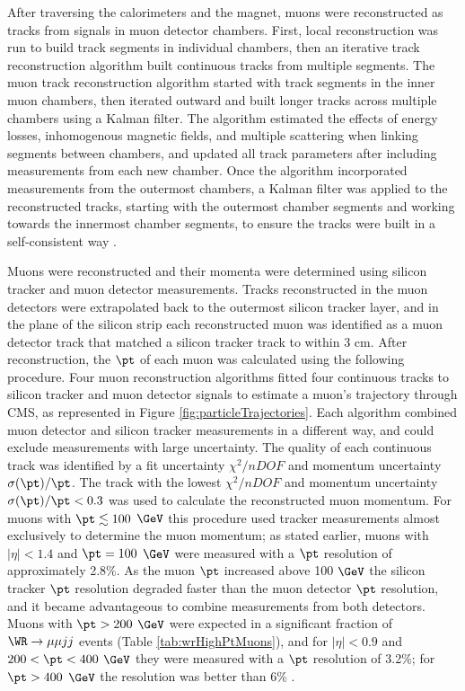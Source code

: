 After traversing the calorimeters and the magnet, muons were reconstructed as tracks from signals in muon detector chambers.  
First, local reconstruction was run to build track segments in individual chambers, then an iterative track 
reconstruction algorithm built continuous tracks from multiple segments.  The muon track reconstruction algorithm started 
with track segments in the inner muon chambers, then iterated outward and built longer tracks across multiple chambers 
using a Kalman filter.  The algorithm estimated the effects of energy losses, inhomogenous magnetic fields, and multiple 
scattering when linking segments between chambers, and updated all track parameters after including measurements 
from each new chamber.  Once the algorithm incorporated measurements from the outermost chambers, a Kalman filter 
was applied to the reconstructed tracks, starting with the outermost chamber segments and working towards the 
innermost chamber segments, to ensure the tracks were built in a self-consistent way \cite{muonRecoFirstCollisions}.  

Muons were reconstructed and their momenta were determined using silicon tracker and muon detector measurements.  
Tracks reconstructed in the muon detectors were extrapolated back to the outermost silicon tracker layer, and in the 
plane of the silicon strip each reconstructed muon was identified as a muon detector track that matched a silicon 
tracker track to within 3 cm.  After reconstruction, the $\pt$ of each muon was calculated using the following procedure.  
Four muon reconstruction algorithms fitted four continuous tracks \cite{cmsMuonRecoRunTwo} to silicon tracker and muon 
detector signals to estimate a muon's trajectory through CMS, as represented in Figure \ref{fig:particleTrajectories}.  Each 
algorithm combined muon detector and silicon tracker measurements in a different way, and could exclude measurements with 
large uncertainty.  The quality of each continuous track was identified by a fit uncertainty $\chi^{2}/nDOF$ and momentum 
uncertainty $\sigma(\pt)/\pt$.  The track with the lowest $\chi^{2}/nDOF$ and momentum uncertainty $\sigma(\pt)/\pt < 0.3$ was 
used to calculate the reconstructed muon momentum.  For muons with $\pt \lesssim 100$ $\GeV$ this procedure used tracker 
measurements almost exclusively to determine the muon momentum; as stated earlier, muons with $|\eta| < 1.4$ and $\pt = 100$ 
$\GeV$ were measured with a $\pt$ resolution of approximately 2.8\%.  As the muon $\pt$ increased above 100 $\GeV$ the 
silicon tracker $\pt$ resolution degraded faster than the muon detector $\pt$ resolution, and it became advantageous to 
combine measurements from both detectors.  Muons with $\pt > 200$ $\GeV$ were expected in a significant fraction of 
$\WR \rightarrow \mu\mu jj$ events (Table \ref{tab:wrHighPtMuons}), and for $|\eta| < 0.9$ and $200 < \pt < 400$ $\GeV$ 
they were measured with a $\pt$ resolution of 3.2\%; for $\pt > 400$ $\GeV$ the resolution was better than 6\% \cite{cmsMuonRecoRunTwo}.


